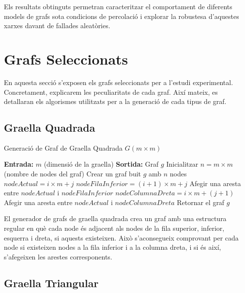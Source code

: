 \documentclass[a4paper]{article}
\begin{document}
	Els resultats obtinguts permetran caracteritzar el comportament de diferents models de grafs sota condicions de percolació i explorar la robustesa d'aquestes xarxes davant de fallades aleatòries.
	
	
	\newpage
	\section{Grafs Seleccionats}

	En aquesta secció s'exposen els grafs seleccionats per a l'estudi experimental. Concretament, explicarem les peculiaritats de cada graf. Així mateix, es detallaran els algorismes utilitzats per a la generació de cada tipus de graf. 

	\subsection{Graella Quadrada}
	\begin{algorithm} [H]
		\caption{Generació de Graf de Graella Quadrada $G(m \times m)$}
		\begin{algorithmic} [1]
			\Statex \textbf{Entrada:} $m$ (dimensió de la graella)
			\Statex \textbf{Sortida:} Graf $g$ 
			\Statex \vspace{-0.25em}
			\State Inicialitzar $n = m \times m$ (nombre de nodes del graf)
			\State Crear un graf buit $g$ amb $n$ nodes
					\State $nodeActual = i \times m + j$
						\State $nodeFilaInferior = (i + 1) \times m + j$
						\State Afegir una aresta entre $nodeActual$ i $nodeFilaInferior$
					\EndIf
						\State $nodeColumnaDreta = i \times m + (j + 1)$
						\State Afegir una aresta entre $nodeActual$ i $nodeColumnaDreta$
					\EndIf
				\EndFor
			\EndFor
			\State Retornar el graf $g$
		\end{algorithmic}
	\end{algorithm}

	El generador de grafs de graella quadrada crea un graf amb una estructura regular en què cada node és adjacent als nodes de la fila superior, inferior, esquerra i dreta, si aquests existeixen. Això s'aconsegueix comprovant per cada node si existeixen nodes a la fila inferior i a la columna dreta, i si és així, s'afegeixen les arestes corresponents. \\

	\subsection{Graella Triangular}
\end{document}
